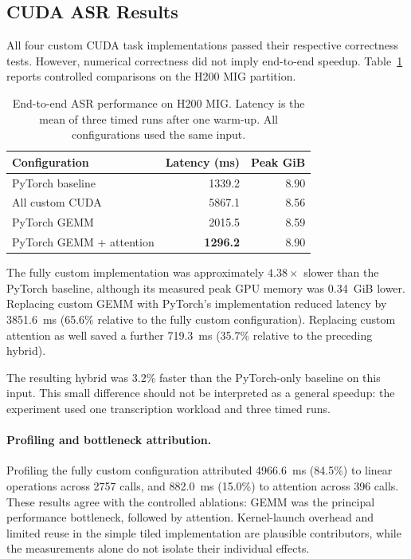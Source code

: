 \subsection{CUDA ASR Results}
\label{sec:cuda_results}

All four custom CUDA task implementations passed their
respective correctness tests. However, numerical
correctness did not imply end-to-end speedup.
Table~\ref{tab:asr_ablation} reports controlled
comparisons on the H200 MIG partition.

\begin{table}[!htbp]
\centering
\caption{End-to-end ASR performance on H200 MIG.
Latency is the mean of three timed runs after one
warm-up. All configurations used the same input.}
\label{tab:asr_ablation}
\small
\begin{tabular}{lrr}
\hline
Configuration & Latency (ms) & Peak GiB \\
\hline
PyTorch baseline & 1339.2 & 8.90 \\
All custom CUDA & 5867.1 & 8.56 \\
PyTorch GEMM & 2015.5 & 8.59 \\
PyTorch GEMM + attention & \textbf{1296.2} & 8.90 \\
\hline
\end{tabular}
\end{table}

The fully custom implementation was approximately
$4.38\times$ slower than the PyTorch baseline,
although its measured peak GPU memory was
0.34~GiB lower. Replacing custom GEMM with
PyTorch's implementation reduced latency by
3851.6~ms (65.6\% relative to the fully custom
configuration). Replacing custom attention as
well saved a further 719.3~ms (35.7\% relative
to the preceding hybrid).

The resulting hybrid was 3.2\% faster than the
PyTorch-only baseline on this input. This small
difference should not be interpreted as a
general speedup: the experiment used one
transcription workload and three timed runs.

\paragraph{Profiling and bottleneck attribution.}
Profiling the fully custom configuration attributed
4966.6~ms (84.5\%) to linear operations across
2757 calls, and 882.0~ms (15.0\%) to attention
across 396 calls. These results agree with the
controlled ablations: GEMM was the principal
performance bottleneck, followed by attention.
Kernel-launch overhead and limited reuse in
the simple tiled implementation are plausible
contributors, while the measurements alone do
not isolate their individual effects.


